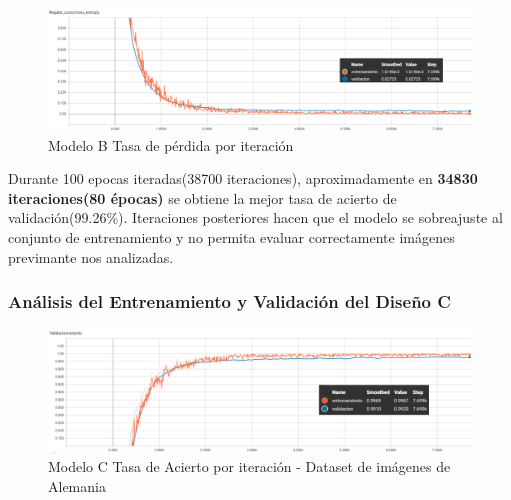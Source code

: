 			
			\begin{figure}[H]
				\begin{center}
				\includegraphics[width=1\textwidth]{images/desarrollo/trainResults/peru/model1Loss} 
				\end{center}
				\begin{center}
				\caption{\small{Modelo B Tasa de pérdida por iteración}}
				
				{\small{\fontsize{10}{16.8}\selectfont {Fuente: Elaboración propia}}}
				\end{center}
				\vspace{-1.5em}
			\end{figure}

			Durante 100 epocas iteradas(38700 iteraciones), aproximadamente en  \textbf{34830 iteraciones(80 épocas)} se obtiene la mejor tasa de acierto de validación(99.26\%). Iteraciones posteriores hacen que el modelo se sobreajuste al conjunto de entrenamiento y no permita evaluar correctamente imágenes previmante nos analizadas.



		\subsubsection{Análisis del Entrenamiento y Validación del Diseño C} 

			\begin{figure}[H]
				\begin{center}
				\includegraphics[width=1\textwidth]{images/desarrollo/trainResults/peru/model4Acierto} 
				\end{center}
				\begin{center}
				\caption{\small{Modelo C Tasa de Acierto por iteración - Dataset de imágenes de Alemania  }}
				
				{\small{\fontsize{10}{16.8}\selectfont {Fuente: Elaboración propia}}}
				\end{center}
				\vspace{-1.5em}
			\end{figure}
			
